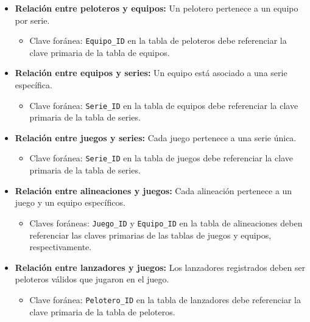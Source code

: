 \documentclass{report}
\begin{document}
    \begin{itemize}
        \item \textbf{Relación entre peloteros y equipos:} Un pelotero pertenece a un equipo por serie. 
        \begin{itemize}
            \item Clave foránea: \texttt{Equipo\_ID} en la tabla de peloteros debe referenciar la clave primaria de 
            la tabla de equipos.
        \end{itemize}

        \item \textbf{Relación entre equipos y series:} Un equipo está asociado a una serie específica. 
        \begin{itemize}
            \item Clave foránea: \texttt{Serie\_ID} en la tabla de equipos debe referenciar la clave primaria de la 
            tabla de series.
        \end{itemize}

        \item \textbf{Relación entre juegos y series:} Cada juego pertenece a una serie única.
        \begin{itemize}
            \item Clave foránea: \texttt{Serie\_ID} en la tabla de juegos debe referenciar la clave primaria de la 
            tabla de series.
        \end{itemize}

        \item \textbf{Relación entre alineaciones y juegos:} Cada alineación pertenece a un juego y un equipo 
        específicos.
        \begin{itemize}
            \item Claves foráneas: \texttt{Juego\_ID} y \texttt{Equipo\_ID} en la tabla de alineaciones deben 
            referenciar las claves primarias de las tablas de juegos y equipos, respectivamente.
        \end{itemize}

        \item \textbf{Relación entre lanzadores y juegos:} Los lanzadores registrados deben ser peloteros válidos 
        que jugaron en el juego.
        \begin{itemize}
            \item Clave foránea: \texttt{Pelotero\_ID} en la tabla de lanzadores debe referenciar la clave primaria 
            de la tabla de peloteros.
        \end{itemize}
    \end{itemize}
\end{document}
